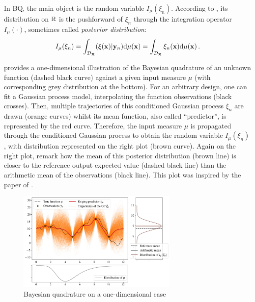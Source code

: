 In BQ, the main object is the random variable $I_{\mu}(\xi_n)$. 
According to \cite{briol_oates_2019}, its distribution on $\mathbb{R}$ is the pushforward of $\xi_n$ through the integration operator $I_\mu(\cdot)$, sometimes called \emph{posterior distribution}: 
\begin{equation}
    I_{\mu}(\xi_n) = \int_{\mathcal{D}_{\bf X}} (\xi({\bf x}) | {\bf y}_n)  \mathrm{d} \mu({\bf x}) = \int_{\mathcal{D}_{\bf X}} \xi_n({\bf x})  \mathrm{d} \mu({\bf x}) \,.
\label{eq:posterior}
\end{equation}

 provides a one-dimensional illustration of the Bayesian quadrature of an unknown function (dashed black curve) against a given input measure $\mu$ (with corresponding grey distribution at the bottom). 
For an arbitrary design, one can fit a Gaussian process model, interpolating the function observations (black crosses). 
Then, multiple trajectories of this conditioned Gaussian process $\xi_n$ are drawn (orange curves) whilst its mean function, also called ``predictor'', is represented by the red curve. 
Therefore, the input measure $\mu$ is propagated through the conditioned Gaussian process to obtain the random variable $I_{\mu}(\xi_n)$, with distribution represented on the right plot (brown curve). 
Again on the right plot, remark how the mean of this posterior distribution (brown line) is closer to the reference output expected value (dashed black line) than the arithmetic mean of the observations (black line). 
This plot was inspired by the paper of \cite{husar_duvenaud_2012}.

\begin{figure}[!h]
\begin{center}
    \includegraphics[width=0.7\textwidth]{part2/figures/DCE/numerical_experiments/posterior_distribution_centered.jpg}
    \caption{Bayesian quadrature on a one-dimensional case}
    \label{fig:bayesian_quad}
\end{center}
\end{figure}


